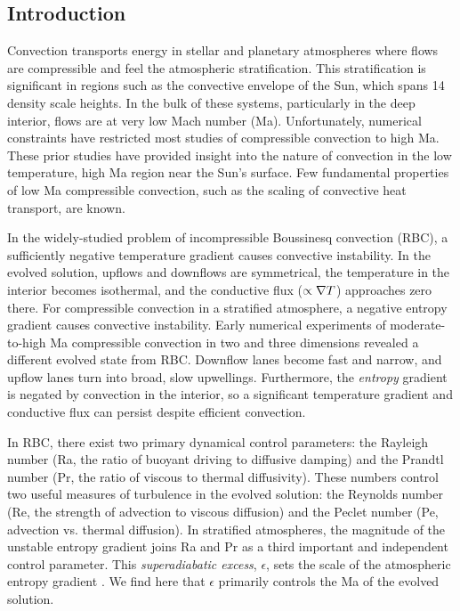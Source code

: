 \subsection{Introduction}
\label{sec:intro}
Convection transports energy in stellar and planetary atmospheres where flows are compressible and feel the atmospheric stratification.  
This stratification is significant in regions such as the convective envelope of the Sun, which spans 14 density scale heights.
In the bulk of these systems, particularly in the deep interior, flows are at very low Mach number (Ma).  
Unfortunately, numerical constraints have restricted most studies of compressible convection to high Ma.
These prior studies \citep{graham1975, chan&all1982, hurlburt&all1984, cattaneo&all1990, brummell&all1996, brandenburg&all2005} have provided insight into the nature of convection in the low temperature, high Ma region near the Sun's surface. 
Few fundamental properties of low Ma compressible convection, such as the scaling of convective heat transport, are known.

In the widely-studied \RB problem of incompressible Boussinesq convection (RBC), a sufficiently negative temperature gradient causes convective instability.
In the evolved solution, upflows and downflows are symmetrical, the temperature in the interior becomes isothermal, and the conductive flux ($\propto \nabla T$) approaches zero there. 
For compressible convection in a stratified atmosphere, a negative entropy gradient causes convective instability.
Early numerical experiments of moderate-to-high Ma compressible convection in two \citep{graham1975, chan&all1982, hurlburt&all1984, cattaneo&all1990} and three \citep{cattaneo&all1991, brandenburg&all2005, brummell&all1996} dimensions revealed a different evolved state from RBC.
Downflow lanes become fast and narrow, and upflow lanes turn into broad, slow upwellings.
Furthermore, the \emph{entropy} gradient is negated by convection in the interior, so a significant temperature gradient and conductive flux can persist despite efficient convection.

In RBC, there exist two primary dynamical control parameters: the Rayleigh number (Ra, the ratio of buoyant driving to diffusive damping) and the Prandtl number (Pr, the ratio of viscous to thermal diffusivity). 
These numbers control two useful measures of turbulence in the evolved solution: the Reynolds number (Re, the strength of advection to viscous diffusion) and the Peclet number (Pe, advection vs. thermal diffusion).  
In stratified atmospheres, the magnitude of the unstable entropy gradient joins Ra and Pr as a third important and independent control parameter.  
This \emph{superadiabatic excess}, $\epsilon$, sets the scale of the atmospheric entropy gradient \citep{graham1975}.
We find here that $\epsilon$ primarily controls the Ma of the evolved solution.

